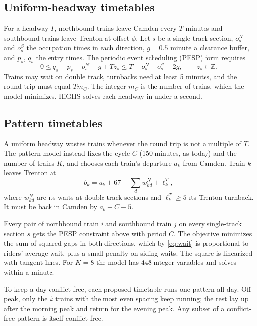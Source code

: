 \documentclass[11pt]{article}
\begin{document}
\subsection{Uniform-headway timetables}\label{sec:mip}
For a headway $T$, northbound trains leave Camden every $T$ minutes and southbound trains leave Trenton at offset $\phi$. Let $s$ be a single-track section, $o^N_s$ and $o^S_s$ the occupation times in each direction, $g=0.5$ minute a clearance buffer, and $p_s$, $q_s$ the entry times. The periodic event scheduling (PESP) form \citep{serafini1989mathematical} requires
\begin{equation}
0 \le q_s - p_s - o^N_s - g + T z_s \le T - o^N_s - o^S_s - 2g, \qquad z_s\in\mathbb{Z}.
\end{equation}
Trains may wait on double track, turnbacks need at least 5 minutes, and the round trip must equal $T m_C$. The integer $m_C$ is the number of trains, which the model minimizes. HiGHS solves each headway in under a second.

\subsection{Pattern timetables}\label{sec:pattern}
A uniform headway wastes trains whenever the round trip is not a multiple of $T$. The pattern model instead fixes the cycle $C$ (150 minutes, as today) and the number of trains $K$, and chooses each train's departure $a_k$ from Camden. Train $k$ leaves Trenton at
\[b_k=a_k+67+\textstyle\sum_d w^N_{kd}+\ell^T_k,\]
where $w^N_{kd}$ are its waits at double-track sections and $\ell^T_k \ge 5$ its Trenton turnback. It must be back in Camden by $a_k+C-5$.

Every pair of northbound train $i$ and southbound train $j$ on every single-track section $s$ gets the PESP constraint above with period $C$. The objective minimizes the sum of squared gaps in both directions, which by \eqref{eq:wait} is proportional to riders' average wait, plus a small penalty on siding waits. The square is linearized with tangent lines. For $K=8$ the model has 448 integer variables and solves within a minute.

To keep a day conflict-free, each proposed timetable runs one pattern all day. Off-peak, only the $k$ trains with the most even spacing keep running; the rest lay up after the morning peak and return for the evening peak. Any subset of a conflict-free pattern is itself conflict-free.
\end{document}
